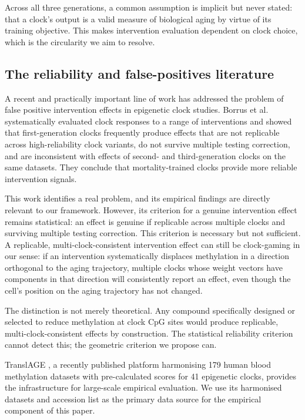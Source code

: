 Across all three generations, a common assumption is implicit but never stated: that
a clock's output is a valid measure of biological aging by virtue of its training
objective. This makes intervention evaluation dependent on clock choice, which is the
circularity we aim to resolve.

\subsection{The reliability and false-positives literature}

A recent and practically important line of work has addressed the problem of false
positive intervention effects in epigenetic clock studies. Borrus et al.\
\cite{borrus2024} systematically evaluated clock responses to a range of interventions
and showed that first-generation clocks frequently produce effects that are not
replicable across high-reliability clock variants, do not survive multiple testing
correction, and are inconsistent with effects of second- and third-generation clocks
on the same datasets. They conclude that mortality-trained clocks provide more reliable
intervention signals.

This work identifies a real problem, and its empirical findings are directly relevant
to our framework. However, its criterion for a genuine intervention effect remains
statistical: an effect is genuine if replicable across multiple clocks and surviving
multiple testing correction. This criterion is necessary but not sufficient. A
replicable, multi-clock-consistent intervention effect can still be clock-gaming in
our sense: if an intervention systematically displaces methylation in a direction
orthogonal to the aging trajectory, multiple clocks whose weight vectors have
components in that direction will consistently report an effect, even though the
cell's position on the aging trajectory has not changed.

The distinction is not merely theoretical. Any compound specifically designed or
selected to reduce methylation at clock CpG sites would produce replicable,
multi-clock-consistent effects by construction. The statistical reliability criterion
cannot detect this; the geometric criterion we propose can.

TranslAGE \cite{translagee2025}, a recently published platform harmonising 179 human
blood methylation datasets with pre-calculated scores for 41 epigenetic clocks,
provides the infrastructure for large-scale empirical evaluation. We use its
harmonised datasets and accession list as the primary data source for the empirical
component of this paper.

